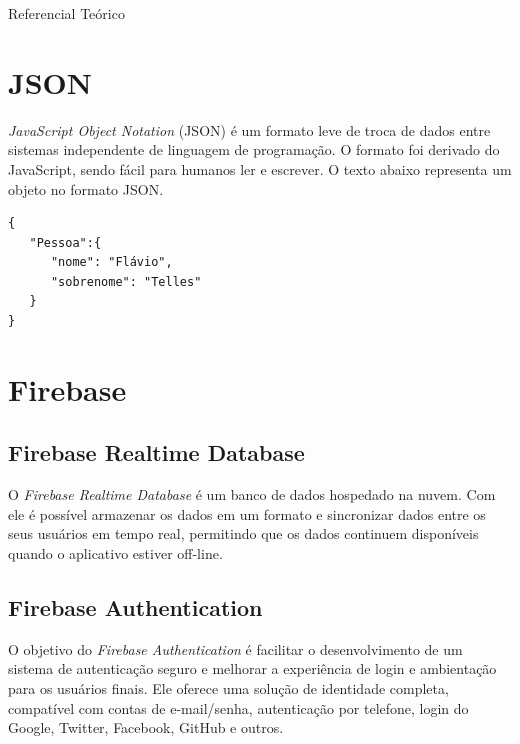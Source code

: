 \documentclass[
	12pt,				%
	openany,			%
	twoside,			%
	a4paper,			%
	english,			%
	french,				%
	spanish,			%
	brazil				%
	]{abntex2}
\begin{document}
\begin{chapter}{Referencial Teórico}
\newpage
\section{JSON} \label{JSON}
\textit{JavaScript Object Notation} (JSON) é um formato leve de troca de dados entre sistemas independente de linguagem de programação. O formato foi derivado do JavaScript, sendo fácil para humanos ler e escrever. O texto abaixo representa um objeto no formato JSON.

\begin{lstlisting}
{
   "Pessoa":{
      "nome": "Flávio",
      "sobrenome": "Telles"
   }
}
\end{lstlisting}

\section{Firebase}
\subsection{Firebase Realtime Database} \label{Firebase Realtime Database}
O \textit{Firebase Realtime Database} é um banco de dados hospedado na nuvem. Com ele é possível armazenar os dados em um formato  e sincronizar dados entre os seus usuários em tempo real, permitindo que os dados continuem disponíveis quando o aplicativo estiver off-line.

\subsection{Firebase Authentication}
O objetivo do \textit{Firebase Authentication} é facilitar o desenvolvimento de um sistema de autenticação seguro e melhorar a experiência de login e ambientação para os usuários finais. Ele oferece uma solução de identidade completa, compatível com contas de e-mail/senha, autenticação por telefone, login do Google, Twitter, Facebook, GitHub e outros.
\end{chapter}
\end{document}
